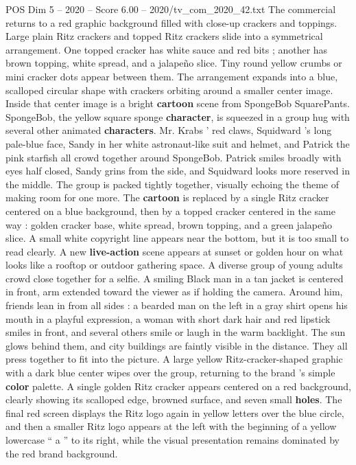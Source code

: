 \begin{textsample}{POS Dim 5 – 2020 – Score 6.00 – 2020/tv\_com\_2020\_42.txt}
The commercial returns to a red graphic background filled with close-up crackers and toppings.
Large plain Ritz crackers and topped Ritz crackers slide into a symmetrical arrangement.
One topped cracker has white sauce and red bits ; another has brown topping, white spread, and a jalapeño slice.
Tiny round yellow crumbs or mini cracker dots appear between them.
The arrangement expands into a blue, scalloped circular shape with crackers orbiting around a smaller center image.
Inside that center image is a bright \textbf{cartoon} scene from SpongeBob SquarePants.
SpongeBob, the yellow square sponge \textbf{character}, is squeezed in a group hug with several other animated \textbf{characters}.
Mr.
Krabs ’ red claws, Squidward ’s long pale-blue face, Sandy in her white astronaut-like suit and helmet, and Patrick the pink starfish all crowd together around SpongeBob.
Patrick smiles broadly with eyes half closed, Sandy grins from the side, and Squidward looks more reserved in the middle.
The group is packed tightly together, visually echoing the theme of making room for one more.
The \textbf{cartoon} is replaced by a single Ritz cracker centered on a blue background, then by a topped cracker centered in the same way : golden cracker base, white spread, brown topping, and a green jalapeño slice.
A small white copyright line appears near the bottom, but it is too small to read clearly.
A new \textbf{live-action} scene appears at sunset or golden hour on what looks like a rooftop or outdoor gathering space.
A diverse group of young adults crowd close together for a selfie.
A smiling Black man in a tan jacket is centered in front, arm extended toward the viewer as if holding the camera.
Around him, friends lean in from all sides : a bearded man on the left in a gray shirt opens his mouth in a playful expression, a woman with short dark hair and red lipstick smiles in front, and several others smile or laugh in the warm backlight.
The sun glows behind them, and city buildings are faintly visible in the distance.
They all press together to fit into the picture.
A large yellow Ritz-cracker-shaped graphic with a dark blue center wipes over the group, returning to the brand ’s simple \textbf{color} palette.
A single golden Ritz cracker appears centered on a red background, clearly showing its scalloped edge, browned surface, and seven small \textbf{holes}.
The final red screen displays the Ritz logo again in yellow letters over the blue circle, and then a smaller Ritz logo appears at the left with the beginning of a yellow lowercase “ a ” to its right, while the visual presentation remains dominated by the red brand background.

\end{textsample}
